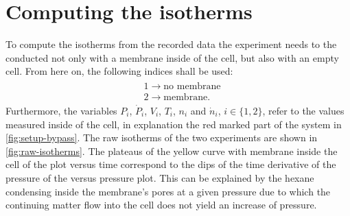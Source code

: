 \documentclass[../thesis.tex]{subfiles}
\begin{document}
    \section{Computing the isotherms}

        To compute the isotherms from the recorded data the experiment needs to the conducted not only with a membrane inside of the cell, but also with an empty cell. From here on, the following indices shall be used:
        \begin{align*}
            \begin{split}
                &1 \longrightarrow \textrm{no membrane} \\
                &2 \longrightarrow \textrm{membrane}.
                \label{eq:index_assignments}
            \end{split}
        \end{align*}
        Furthermore, the variables $P_i$, $\dot{P}_i$, $V_i$, $T_i$, $n_i$ and $\dot{n}_i$, $i\in \{1,2\}$, refer to the values measured inside of the cell, in explanation the red marked part of the system in \cref{fig:setup-bypass}. The raw isotherms of the two experiments are shown in \cref{fig:raw-isotherms}. The plateaus of the yellow curve with membrane inside the cell of the plot versus time  correspond to the dips of the time derivative of the pressure of the versus pressure plot. This can be explained by the hexane condensing inside the membrane's pores at a given pressure due to which the continuing matter flow into the cell does not yield an increase of pressure.
        \medskip

        
\end{document}
